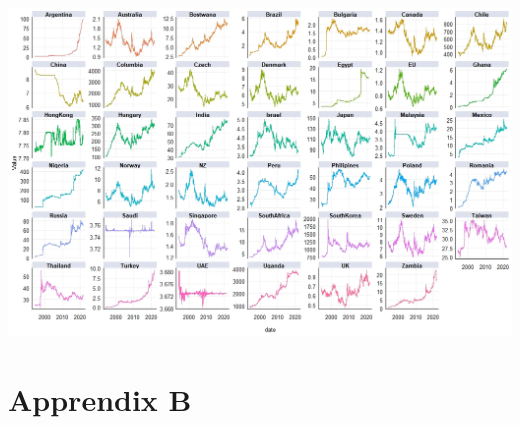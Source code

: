 \documentclass[11pt,preprint, authoryear]{elsarticle}
\let\origfigure\figure
\let\endorigfigure\endfigure
\renewenvironment{figure}[1][2] {
    \expandafter\origfigure\expandafter[H]
} {
    \endorigfigure
}
\numberwithin{equation}{section}
\numberwithin{figure}{section}
\numberwithin{table}{section}
\begin{document}
\begin{figure}
\centering
\includegraphics[scale=0.55]{descriptive.jpg}
\caption{Currency rates of all 33 emerging and developing market countries}
\label{data}
\end{figure}

\hypertarget{apprendix-b}{%
\section*{Apprendix B}\label{apprendix-b}}
\end{document}
